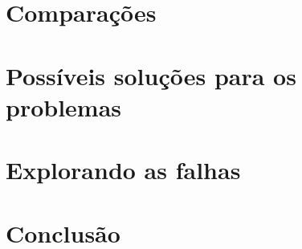 \documentclass[
	12pt,				%
	openright,			%
	twoside,			%
	a4paper,			%
	english,			%
	french,				%
	spanish,			%
	brazil				%
	]{abntex2}
\begin{document}
\chapter{Comparações}

\chapter{Possíveis soluções para os problemas}

\chapter{Explorando as falhas}


\chapter{Conclusão}

\postextual


%

\printindex
\end{document}
